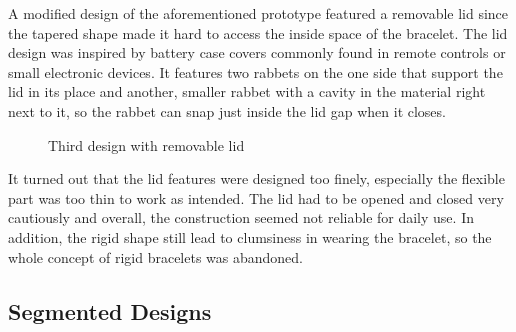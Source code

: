 A modified design of the aforementioned prototype featured a removable lid since the tapered shape made it hard to access the inside space of the bracelet. The lid design was inspired by battery case covers commonly found in remote controls or small electronic devices. It features two rabbets on the one side that support the lid in its place and another, smaller rabbet with a cavity in the material right next to it, so the rabbet can snap just inside the lid gap when it closes.

\begin{figure}[bth]
	\myfloatalign
	 \quad
	\caption{Third design with removable lid}
\end{figure}

It turned out that the lid features were designed too finely, especially the flexible part was too thin to work as intended. The lid had to be opened and closed very cautiously and overall, the construction seemed not reliable for daily use. In addition, the rigid shape still lead to clumsiness in wearing the bracelet, so the whole concept of rigid bracelets was abandoned.

\subsection{Segmented Designs}

